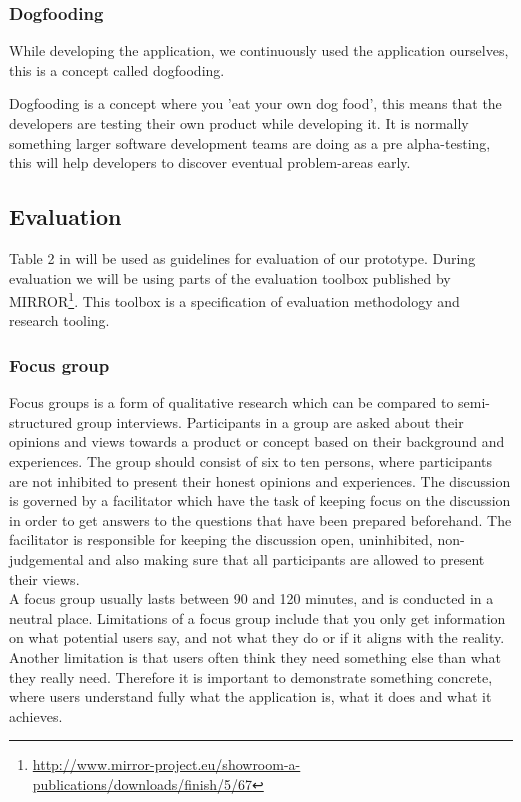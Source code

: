\subsubsection*{Dogfooding}
While developing the application, we continuously used the application ourselves, this is a concept called dogfooding.

Dogfooding is a concept where you 'eat your own dog food', this means that the developers are testing their own product while developing it\citep{dogfooding}. It is normally something larger software development teams are doing as a pre alpha-testing, this will help developers to discover eventual problem-areas early.

\subsection{Evaluation}
Table 2 in \citep{Esearch2004} will be used as guidelines for evaluation of our prototype. 
During evaluation we will be using parts of the evaluation toolbox published by MIRROR\footnote{\url{http://www.mirror-project.eu/showroom-a-publications/downloads/finish/5/67}}. This toolbox is a specification of evaluation methodology and research tooling. 

\subsubsection{Focus group}
Focus groups is a form of qualitative research which can be compared to semi-structured group interviews\citep{rogers2011interaction}. Participants in a group are asked about their opinions and views towards a product or concept based on their background and experiences\citep{krueger2008focus}. The group should consist of six to ten persons, where participants are not inhibited to present their honest opinions and experiences\citep{krueger2008focus}. The discussion is governed by a facilitator which have the task of keeping focus on the discussion in order to get answers to the questions that have been prepared beforehand\citep{krueger2008focus, nielsen1997use}. The facilitator is responsible for keeping the discussion open, uninhibited, non-judgemental and also making sure that all participants are allowed to present their views\citep{powell1996focus}. \\
A focus group usually lasts between 90 and 120 minutes, and is conducted in a neutral place. Limitations of a focus group include that you only get information on what potential users say, and not what they do or if it aligns with the reality\citep{nielsen1997use}. Another limitation is that users often think they need something else than what they really need. Therefore it is important to demonstrate something concrete, where users understand fully what the application is, what it does and what it achieves. 
 
